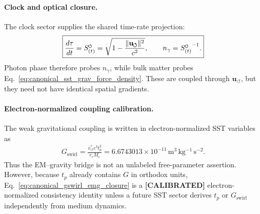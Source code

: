 \documentclass[11pt]{article}
\theoremstyle{definition}
\theoremstyle{plain}
\theoremstyle{remark}
\newcommand{\swirlarrow}{\mathchoice{\mkern-2mu\scriptstyle\boldsymbol{\circlearrowleft}}{\mkern-2mu\scriptstyle\boldsymbol{\circlearrowleft}}{\mkern-2mu\scriptscriptstyle\boldsymbol{\circlearrowleft}}{\mkern-2mu\scriptscriptstyle\boldsymbol{\circlearrowleft}}}
\newcommand{\SwirlClock}{{S_{(t)}^{\swirlarrow}}}
\newcommand{\rc}{{r_c}}
\newcommand{\vchar}{v_{\!\boldsymbol{\circlearrowleft}}^{\ast}}
\newcommand{\uswirl}{\mathbf{u}_{\!\boldsymbol{\circlearrowleft}}}
\begin{document}
        \paragraph{Clock and optical closure.}
        The clock sector supplies the shared time-rate projection:
        \begin{align}
            \boxed{
            \frac{d\tau}{dt}
            =
            \SwirlClock
            =
            \sqrt{1-\frac{\lVert\uswirl\rVert^2}{c^2}},
            \qquad
            n_\gamma=\SwirlClock^{-1}.
            }
            \label{eq:canonical_emg_clock_optical_closure}
        \end{align}
        Photon phase therefore probes \(n_\gamma\), while bulk matter probes Eq.~\eqref{eq:canonical_sst_grav_force_density}. These are coupled through \(\uswirl\), but they need not have identical spatial gradients.

        \paragraph{Electron-normalized coupling calibration.}
        The weak gravitational coupling is written in electron-normalized SST variables as
        \begin{align}
            \boxed{
            G_{\mathrm{swirl}}
            =
            \frac{\vchar c^3 t_p^2}{\rc M_e}
            =
            6.6743013\times10^{-11}\,\mathrm{m^3\,kg^{-1}\,s^{-2}}.
            }
            \label{eq:canonical_gswirl_emg_closure}
        \end{align}
        Thus the EM--gravity bridge is not an unlabeled free-parameter assertion. However, because \(t_p\) already contains \(G\) in orthodox units, Eq.~\eqref{eq:canonical_gswirl_emg_closure} is a \textbf{[CALIBRATED]} electron-normalized consistency identity unless a future SST sector derives \(t_p\) or \(G_{\mathrm{swirl}}\) independently from medium dynamics.
\end{document}
